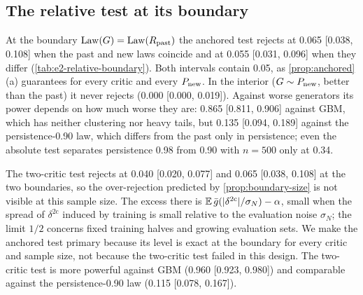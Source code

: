 \subsection{The relative test at its boundary}\label{sec:sim-relative}

\begin{table}[tbp]
  \centering
  \caption{Relative tests at the boundary and in the interior of the null (E2 part e): rejection
    rates with Wilson 95\% intervals, $n=500$ independent windows of $L=20$ days in each of $\Rnew$,
    $\Rpast$ and $G$, 200 replications per cell, \WC{} base. GARCH $x$: the \GARCHt{} law with
    persistence $x$.}
  \label{tab:e2-relative-boundary}
  \small
\end{table}

At the boundary $\operatorname{Law}(G)=\operatorname{Law}(R_{\mathrm{past}})$ the anchored test rejects at 0.065 [0.038, 0.108] when the
past and new laws coincide and at 0.055 [0.031, 0.096] when they differ
(\cref{tab:e2-relative-boundary}). Both intervals contain 0.05, as \cref{prop:anchored}(a)
guarantees for every critic and every $P_{\mathrm{new}}$. In the interior ($G\sim P_{\mathrm{new}}$, better than the past)
it never rejects (0.000 [0.000, 0.019]). Against worse generators its power depends on how much
worse they are: 0.865 [0.811, 0.906] against GBM, which has neither clustering nor heavy tails, but
0.135 [0.094, 0.189] against the persistence-0.90 law, which differs from the past only in
persistence; even the absolute \WC{} test separates persistence 0.98 from 0.90 with $n=500$ only at
0.34.

The two-critic test rejects at 0.040 [0.020, 0.077] and 0.065 [0.038, 0.108] at the two boundaries,
so the over-rejection predicted by \cref{prop:boundary-size} is not visible at this sample size. The
excess there is $\mathbb{E}\,\bar g(\lvert\delta^{\mathrm{2c}}\rvert/\sigma_N)-\alpha$, small when the spread of
$\delta^{\mathrm{2c}}$ induced by training is small relative to the evaluation noise $\sigma_N$; the
limit $1/2$ concerns fixed training halves and growing evaluation sets. We make the anchored test
primary because its level is exact at the boundary for every critic and sample size, not because
the two-critic test failed in this design. The two-critic test is more powerful against GBM (0.960
[0.923, 0.980]) and comparable against the persistence-0.90 law (0.115 [0.078, 0.167]).

